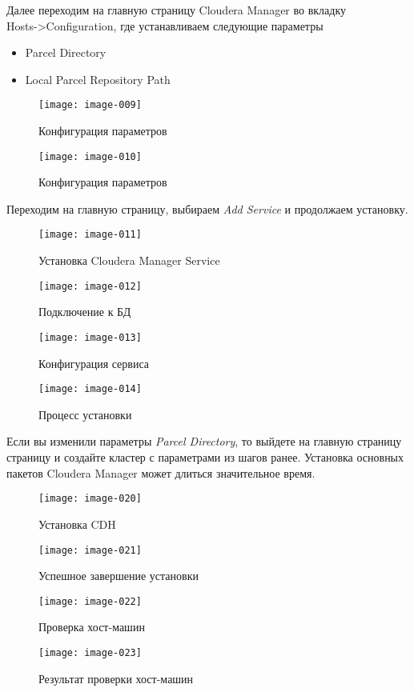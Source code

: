 Далее переходим на главную страницу Cloudera Manager во вкладку \\
Hosts->Configuration, где устанавливаем следующие параметры
\begin{itemize}
    \item Parcel Directory
    \item Local Parcel Repository Path
\end{itemize}

\begin{figure}[ht!]
    \center
    \texttt{[image: image-009]}
    \caption{Конфигурация параметров}
    \texttt{[image: image-010]}
    \caption{Конфигурация параметров}
\end{figure}
Переходим на главную страницу, выбираем \emph{Add Service} и продолжаем установку.

\newpage

\begin{figure}[ht!]
    \center
    \texttt{[image: image-011]}
    \caption{Установка Cloudera Manager Service}
    \texttt{[image: image-012]}
    \caption{Подключение к БД}
\end{figure}

\newpage

\begin{figure}[ht!]
    \center
    \texttt{[image: image-013]}
    \caption{Конфигурация сервиса}
    \texttt{[image: image-014]}
    \caption{Процесс установки}
\end{figure}

Если вы изменили параметры \emph{Parcel Directory}, то выйдете на главную страницу страницу и 
создайте кластер с параметрами из шагов ранее. Установка основных пакетов Cloudera Manager 
может длиться значительное время.

\newpage

\begin{figure}[ht!]
    \center
    \texttt{[image: image-020]}
    \caption{Установка CDH}
    \texttt{[image: image-021]}
    \caption{Успешное завершение установки}
\end{figure}

\newpage

\begin{figure}[ht!]
    \center
    \texttt{[image: image-022]}
    \caption{Проверка хост-машин}
    \texttt{[image: image-023]}
    \caption{Результат проверки хост-машин}
\end{figure}

